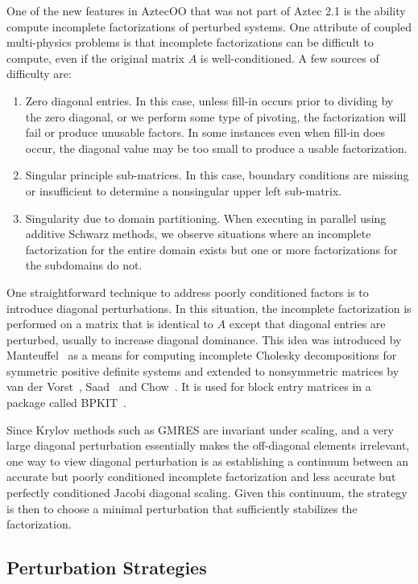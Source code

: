 \documentclass[12pt,relax]{AztecOOUserGuide}
\begin{document}
One of the new features in AztecOO that was not part of Aztec 2.1 is
the ability compute incomplete factorizations of perturbed systems.
One attribute of coupled multi-physics problems is
that incomplete factorizations can be difficult to compute,
even if the original matrix $A$ is well-conditioned.  A few sources of
difficulty are:
\begin{enumerate}
\item Zero diagonal entries.  In this case, unless fill-in occurs prior
to dividing by the zero diagonal, or we perform some type of pivoting, the
factorization will fail or produce unusable factors.  In some
instances even when fill-in does occur, the diagonal value may be 
too small to produce a usable factorization.
\item Singular principle sub-matrices.  In this case, boundary
conditions are missing or insufficient to determine a nonsingular
upper left sub-matrix.
\item Singularity due to domain partitioning.  When executing in
parallel using additive Schwarz methods, we observe situations where
an incomplete factorization for the entire domain exists but one or
more factorizations for the subdomains do not.
\end{enumerate}

One straightforward technique to address poorly conditioned factors
is to introduce diagonal perturbations.  In this
situation, the incomplete factorization is performed on a matrix that
is identical to $A$ except that diagonal entries 
are perturbed, usually to increase diagonal dominance.
This idea was introduced by
Manteuffel~\cite{Manteuffel:80} as a means for computing incomplete
Cholesky decompositions for symmetric positive definite systems 
and extended to nonsymmetric matrices by van der
Vorst~\cite{vanderVorst:81},
Saad~\cite{Saad:94a} and Chow~\cite{Chow:97}.  It is used for 
block entry matrices in a package called BPKIT~\cite{ChowHeroux:98}.

Since Krylov methods such as GMRES are invariant under scaling, and 
a very large diagonal 
perturbation essentially makes the off-diagonal elements irrelevant,
one way to view diagonal perturbation is as establishing a continuum
between an accurate but poorly conditioned incomplete factorization
and less accurate but perfectly conditioned Jacobi diagonal scaling.
Given this continuum, the strategy is then to choose a minimal perturbation
that sufficiently stabilizes the factorization.


\subsection{Perturbation Strategies}
\end{document}

